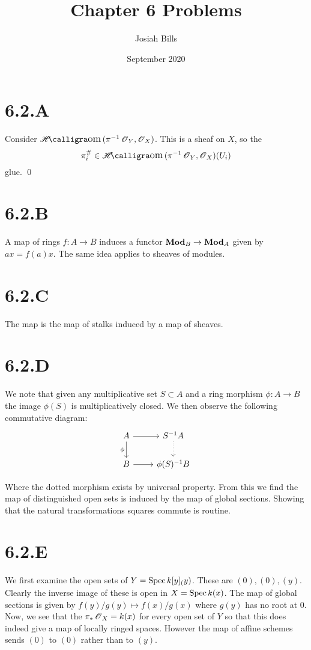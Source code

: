 \documentclass{article}
\title{Chapter 6 Problems}
\author{Josiah Bills}
\date{September 2020}
\begin{document}
\maketitle

\section{6.2.A}
Consider $\Hom(\pi^{-1}\Osh_Y, \Osh_X)$. This is a sheaf on $X$, so
the \[\pi^{\#}_i \in \Hom(\pi^{-1}\Osh_Y, \Osh_X)(U_i)\] glue. \qed

\section{6.2.B}
A map of rings $f: A \to B$ induces a functor $\mathbf{Mod}_B \to \mathbf{Mod}_A$
given by $ax=f(a)x$. The same idea applies to sheaves of modules.

\section{6.2.C}
The map is the map of stalks induced by a map of sheaves.

\section{6.2.D}
We note that given any multiplicative set $S \subset A$ and a ring
morphism $\phi : A \to B$ the image $\phi(S)$ is
multiplicatively closed. We then observe the following commutative diagram:
\[
    \begin{tikzcd}
        A \ar[r] \ar[d, "\phi", swap] & S^{-1}A \ar[d, dotted] \\
        B \ar[r]                      & \phi(S)^{-1}B
    \end{tikzcd}
\]

Where the dotted morphism exists by universal property. From this we find the
map of distinguished open sets is induced by the map of global sections.
Showing that the natural transformations squares commute is routine.

\section{6.2.E}
We first examine the open sets of $Y=\operatorname{Spec} k[y]_(y)$. These are
${(0)}, {(0), (y)}$. Clearly the inverse image of these is open in
$X=\operatorname{Spec} k(x)$. The map of global sections is given by
$f(y)/g(y) \mapsto f(x)/g(x)$ where $g(y)$ has no root at 0. Now, we
see that the $\pi_*\operatorname{\mathscr{O}}_X=k(x)$ for every open set of
$Y$ so that this does indeed give a map of locally ringed
spaces. However the map of affine schemes sends $(0)$ to
$(0)$ rather than to $(y)$.
\end{document}
